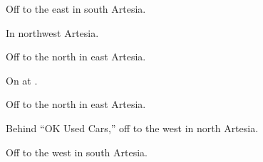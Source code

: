 
\begin{LocationList}

Off  to the east in south Artesia.

In northwest Artesia.

Off  to the north in east Artesia.

\Location{\GasStation \Gas}
On  at .

Off  to the north in east Artesia.

\Location{\RestArea \Rest}
Behind “OK Used Cars,” off  to the west in north Artesia.

\Location{\TruckService \Service}
Off  to the west in south Artesia.

\end{LocationList}
